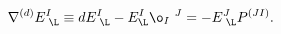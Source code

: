 \begin{equation}
\nabla^{(d)}E^{I}_{\,\,\L}\equiv
dE^{I}_{\,\,\L}-E^I_{\L}\o_I\,\,^J =-E^{J}_{\,\,\L}P^{(JI)}.
\end{equation}

